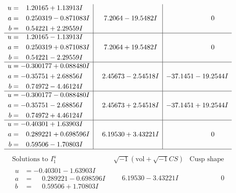 \documentclass[1p]{elsarticle_modified}
\theoremstyle{definition}
\newcommand{\I}{\sqrt{-1}}
\begin{document}
$$\begin{array}{c|c|c}
\begin{aligned}
u &= \phantom{-}1.20165 + 1.13913 I \\
a &= \phantom{-}0.250319 - 0.871083 I \\
b &= \phantom{-}0.54221 + 2.29559 I\end{aligned}
 & \phantom{-}7.2064 - 19.5482 I & \phantom{-0.000000 } 0 \\ \hline\begin{aligned}
u &= \phantom{-}1.20165 - 1.13913 I \\
a &= \phantom{-}0.250319 + 0.871083 I \\
b &= \phantom{-}0.54221 - 2.29559 I\end{aligned}
 & \phantom{-}7.2064 + 19.5482 I & \phantom{-0.000000 } 0 \\ \hline\begin{aligned}
u &= -0.300177 + 0.088480 I \\
a &= -0.35751 + 2.68856 I \\
b &= \phantom{-}0.74972 - 4.46124 I\end{aligned}
 & \phantom{-}2.45673 - 2.54518 I & -37.1451 - 19.2544 I \\ \hline\begin{aligned}
u &= -0.300177 - 0.088480 I \\
a &= -0.35751 - 2.68856 I \\
b &= \phantom{-}0.74972 + 4.46124 I\end{aligned}
 & \phantom{-}2.45673 + 2.54518 I & -37.1451 + 19.2544 I \\ \hline\begin{aligned}
u &= -0.40301 + 1.63903 I \\
a &= \phantom{-}0.289221 + 0.698596 I \\
b &= \phantom{-}0.59506 - 1.70803 I\end{aligned}
 & \phantom{-}6.19530 + 3.43221 I & \phantom{-0.000000 } 0\\
 \hline 
 \end{array}$$\newpage$$\begin{array}{c|c|c}  
\text{Solutions to }I^u_{1}& \I (\text{vol} + \sqrt{-1}CS) & \text{Cusp shape}\\
 \hline 
\begin{aligned}
u &= -0.40301 - 1.63903 I \\
a &= \phantom{-}0.289221 - 0.698596 I \\
b &= \phantom{-}0.59506 + 1.70803 I\end{aligned}
 & \phantom{-}6.19530 - 3.43221 I & \phantom{-0.000000 } 0 \\ \hline\begin{aligned}

\end{aligned}
\end{array}$$
\end{document}
